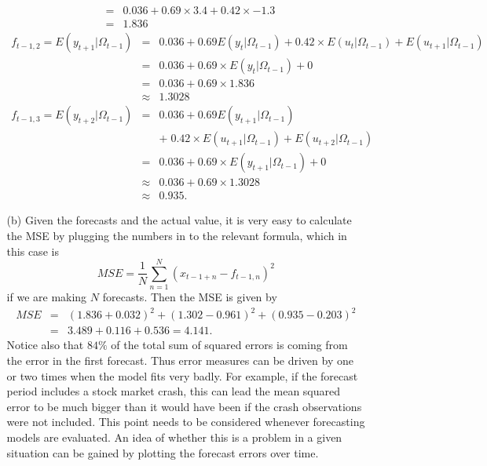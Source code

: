 \documentclass[11pt,a4paper]{article}
\begin{document}
\begin{itemize}
\begin{itemize}
$$\begin{array}{rcl}
 & = & 0.036 +0.69 \times 3.4 + 0.42\times -1.3 \\
& = & 1.836
\end{array}
$$
$$
\begin{array}{rcl}
 f_{t-1,2} = E(y_{t+1}|\Omega_{t-1}) & = & 0.036 +0.69 E(y_{t}|\Omega_{t-1}) + 0.42\times E(u_{t}| \Omega_{t-1}) + E(u_{t+1}| \Omega_{t-1}) \\
 & = & 0.036 +0.69 \times E(y_{t}|\Omega_{t-1}) + 0 \\
 & = & 0.036 +0.69 \times 1.836  \\
&\approx & 1.3028
\end{array}
$$
$$
\begin{array}{rcl}
 f_{t-1,3} = E(y_{t+2}|\Omega_{t-1}) & = & 0.036 +0.69 E(y_{t+1}|\Omega_{t-1})\\ && +\; 0.42\times E(u_{t+1}| \Omega_{t-1}) + E(u_{t+2}| \Omega_{t-1}) \\
 & = & 0.036 +0.69 \times E(y_{t+1}|\Omega_{t-1}) + 0 \\
 & \approx & 0.036 +0.69 \times 1.3028  \\
& \approx & 0.935.
\end{array}
$$
\item[(b)] Given the forecasts and the actual value, it is very easy to
calculate the MSE by plugging the numbers in to the relevant formula, which in
this case is
$$
MSE =
\frac{1}{N} \sum_{n=1}^N \left( x_{t -1+ n} - f_{t -1, n} \right)^2
$$
if we are making $N$ forecasts. Then the MSE is given by
$$
\begin{array}{rcl}
MSE &  =  & (1.836 + 0.032)^2 + (1.302 - 0.961)^2 + (0.935 - 0.203)^2  \\
& = & 3.489 + 0.116 + 0.536 =  4.141.
\end{array}
$$
Notice also that $84\%$ of the total sum of squared errors is coming from the error
in the first forecast. Thus error measures can be driven by one or two times
when the model fits very badly. For example, if the forecast period includes
a stock market crash, this can lead the mean squared error to be much
bigger than it would have been if the crash observations were not included.
This point needs to be considered whenever forecasting models are evaluated.
An idea of whether this is a problem in a given situation can be gained by
plotting the forecast errors over time.

\end{itemize}
\end{itemize}
\end{document}
